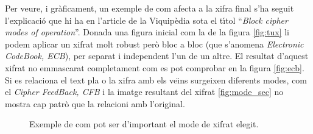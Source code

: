 \documentclass[12pt,twoside,catalan,a4paper]{book}%
\numberwithin{figure}{section}		%
\theoremstyle{definition}   			%
\theoremstyle{saltolinea}   			%
\begin{document}
Per veure, i gr\`aficament, un exemple de com afecta a la xifra final s'ha seguit l'explicaci\'o que hi ha en l'article de la Viquip\`edia sota el t\'{\i}tol ``\emph{Block cipher modes of operation}''. Donada una figura inicial com la de la figura \ref{fig:tux} li podem aplicar un xifrat molt robust per\`o bloc a bloc (que s'anomena \emph{Electronic CodeBook, ECB}), per separat i independent l'un de un altre. El resultat d'aquest xifrat no emmascarat completament com es pot comprobar en la figura \ref{fig:ecb}. Si es relaciona el text pla o la xifra amb els ve\"{\i}ns surgeixen diferents modes, com el \emph{Cipher FeedBack, CFB} i la imatge resultant del xifrat \ref{fig:mode_sec} no mostra cap patr\`o que la relacioni amb l'original.
\begin{figure}[ht]
  \centering
  \caption{Exemple de com pot ser d'important el mode de xifrat el\lgem{}egit.}
  \label{fig:modes}
\end{figure}
\end{document}
